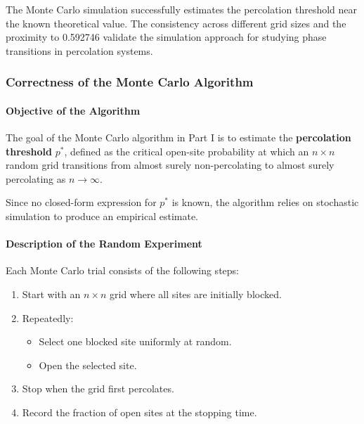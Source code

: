 \documentclass[11pt]{article}
\providecommand{\tightlist}{%
      \setlength{\itemsep}{0pt}\setlength{\parskip}{0pt}}
\begin{document}
The Monte Carlo simulation successfully estimates the percolation
threshold near the known theoretical value. The consistency across
different grid sizes and the proximity to 0.592746 validate the
simulation approach for studying phase transitions in percolation
systems.

    \subsubsection{Correctness of the Monte Carlo
Algorithm}\label{correctness-of-the-monte-carlo-algorithm}

\paragraph{Objective of the Algorithm}\label{objective-of-the-algorithm}

The goal of the Monte Carlo algorithm in Part I is to estimate the
\textbf{percolation threshold} \(p^*\), defined as the critical
open-site probability at which an \(n \times n\) random grid transitions
from almost surely non-percolating to almost surely percolating as
\(n\to\infty\).

Since no closed-form expression for \(p^*\) is known, the algorithm
relies on stochastic simulation to produce an empirical estimate.

\paragraph{Description of the Random
Experiment}\label{description-of-the-random-experiment}

Each Monte Carlo trial consists of the following steps:

\begin{enumerate}
\def\labelenumi{\arabic{enumi}.}
\tightlist
\item
  Start with an \(n\times n\) grid where all sites are initially
  blocked.
\item
  Repeatedly:

  \begin{itemize}
  \tightlist
  \item
    Select one blocked site uniformly at random.
  \item
    Open the selected site.
  \end{itemize}
\item
  Stop when the grid first percolates.
\item
  Record the fraction of open sites at the stopping time.
\end{enumerate}
\end{document}
